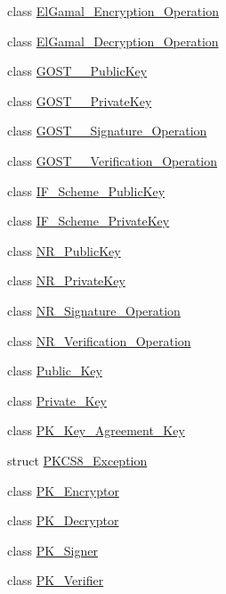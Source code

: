 \begin{DoxyCompactItemize}
class \hyperlink{classBotan_1_1ElGamal__Encryption__Operation}{El\-Gamal\-\_\-\-Encryption\-\_\-\-Operation}
\item 
class \hyperlink{classBotan_1_1ElGamal__Decryption__Operation}{El\-Gamal\-\_\-\-Decryption\-\_\-\-Operation}
\item 
class \hyperlink{classBotan_1_1GOST__3410__PublicKey}{G\-O\-S\-T\-\_\-\_\-\-Public\-Key}
\item 
class \hyperlink{classBotan_1_1GOST__3410__PrivateKey}{G\-O\-S\-T\-\_\-\_\-\-Private\-Key}
\item 
class \hyperlink{classBotan_1_1GOST__3410__Signature__Operation}{G\-O\-S\-T\-\_\-\_\-\-Signature\-\_\-\-Operation}
\item 
class \hyperlink{classBotan_1_1GOST__3410__Verification__Operation}{G\-O\-S\-T\-\_\-\_\-\-Verification\-\_\-\-Operation}
\item 
class \hyperlink{classBotan_1_1IF__Scheme__PublicKey}{I\-F\-\_\-\-Scheme\-\_\-\-Public\-Key}
\item 
class \hyperlink{classBotan_1_1IF__Scheme__PrivateKey}{I\-F\-\_\-\-Scheme\-\_\-\-Private\-Key}
\item 
class \hyperlink{classBotan_1_1NR__PublicKey}{N\-R\-\_\-\-Public\-Key}
\item 
class \hyperlink{classBotan_1_1NR__PrivateKey}{N\-R\-\_\-\-Private\-Key}
\item 
class \hyperlink{classBotan_1_1NR__Signature__Operation}{N\-R\-\_\-\-Signature\-\_\-\-Operation}
\item 
class \hyperlink{classBotan_1_1NR__Verification__Operation}{N\-R\-\_\-\-Verification\-\_\-\-Operation}
\item 
class \hyperlink{classBotan_1_1Public__Key}{Public\-\_\-\-Key}
\item 
class \hyperlink{classBotan_1_1Private__Key}{Private\-\_\-\-Key}
\item 
class \hyperlink{classBotan_1_1PK__Key__Agreement__Key}{P\-K\-\_\-\-Key\-\_\-\-Agreement\-\_\-\-Key}
\item 
struct \hyperlink{structBotan_1_1PKCS8__Exception}{P\-K\-C\-S8\-\_\-\-Exception}
\item 
class \hyperlink{classBotan_1_1PK__Encryptor}{P\-K\-\_\-\-Encryptor}
\item 
class \hyperlink{classBotan_1_1PK__Decryptor}{P\-K\-\_\-\-Decryptor}
\item 
class \hyperlink{classBotan_1_1PK__Signer}{P\-K\-\_\-\-Signer}
\item 
class \hyperlink{classBotan_1_1PK__Verifier}{P\-K\-\_\-\-Verifier}

\end{DoxyCompactItemize}
